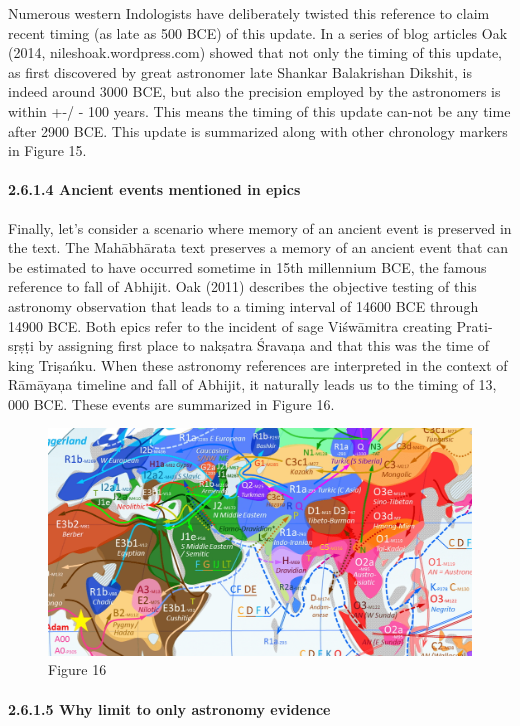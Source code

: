 Numerous western Indologists have deliberately twisted this reference to claim recent timing (as late as 500 BCE) of this update. In a series of blog articles Oak (2014, nileshoak.wordpress.com) showed that not only the timing of this update, as first discovered by great astronomer late Shankar Balakrishan Dikshit, is indeed around 3000 BCE, but also the precision employed by the astronomers is within +-/ - 100 years. This means the timing of this update can-not be any time after 2900 BCE. This update is summarized along with other chronology markers in Figure 15.


\paragraph{2.6.1.4 Ancient events mentioned in epics}

Finally, let’s consider a scenario where memory of an ancient event is preserved in the text. The Mahābhārata text preserves a memory of an ancient event that can be estimated to have occurred sometime in 15th millennium BCE, the famous reference to fall of Abhijit. Oak (2011) describes the objective testing of this astronomy observation that leads to a timing interval of 14600 BCE through 14900 BCE. Both epics refer to the incident of sage Viśwāmitra creating Prati-sṛṣṭi by assigning first place to nakṣatra Śravaņa and that this was the time of king Triṣańku. When these astronomy references are interpreted in the context of Rāmāyaņa timeline and fall of Abhijit, it naturally leads us to the timing of 13, 000 BCE. These events are summarized in Figure 16.

\begin{figure}
\includegraphics{"images/8-16.jpg"}
\caption{Figure 16}
\end{figure}


\paragraph{2.6.1.5 Why limit to only astronomy evidence}

